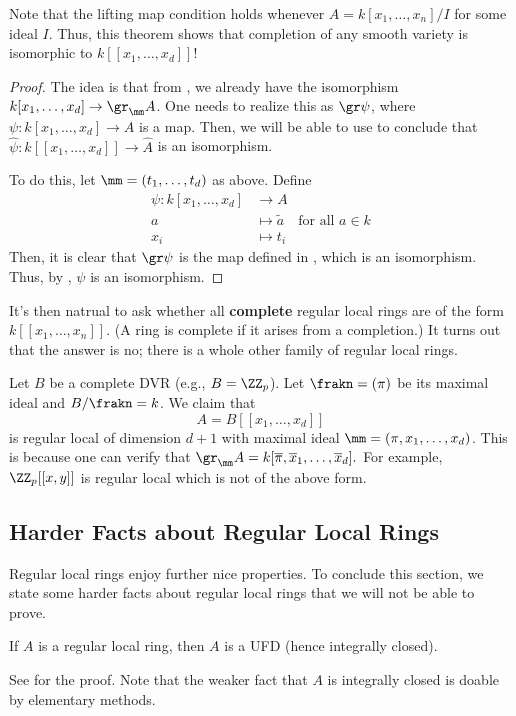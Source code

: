 Note that the lifting map condition holds whenever
$A = k[x_1,\dots,x_n]/I$ for some ideal $I$.
Thus, this theorem shows that completion of any smooth
variety is isomorphic to $k[[x_1,\dots,x_d]]$!
\begin{proof}
The idea is that from ,
we already have the isomorphism
$k[x_1,\dots,x_d]\to \gr_\mm A$. 
One needs to realize this as $\gr\psi$,
where $\psi : k[x_1,\dots,x_d] \to A$ is a map.
Then, we will be able to use 
to conclude that $\widehat\psi : k[[x_1,\dots,x_d]] \to \widehat A$
is an isomorphism.

To do this, let $\mm = (t_1,\dots,t_d)$ as above. Define 
\begin{align*}
    \psi : k[x_1,\dots,x_d] &\to A \\
    a &\mapsto \widetilde a \quad\text{for all } a\in k \\
    x_i &\mapsto t_i
\end{align*}
Then, it is clear that $\gr\psi$ is the map defined
in , which is an isomorphism.
Thus, by ,
$\psi$ is an isomorphism.
\end{proof}
It's then natrual to ask whether all \textbf{complete} 
regular local rings are of the form $k[[x_1,\dots,x_n]]$.
(A ring is complete if it arises from a completion.)
It turns out that the answer is no;
there is a whole other family of regular local rings.
\begin{example}
    Let $B$ be a complete DVR (e.g., $B=\ZZ_p$).
    Let $\frakn=(\pi)$ be its maximal ideal and $B/\frakn=k$.
    We claim that
    $$A = B[[x_1,\dots,x_d]]$$
    is regular local of dimension $d+1$ with
    maximal ideal $\mm = (\pi,x_1,\dots,x_d)$. 
    This is because one can verify that
    $\gr_\mm A = k[\overline \pi, \overline x_1,
    \dots,\overline x_d].$
    For example, $\ZZ_p[[x,y]]$ is regular local
    which is not of the above form.
\end{example}

\subsection{Harder Facts about Regular Local Rings}
\label{subsec:regular_local_hard_facts}
Regular local rings enjoy further nice properties.
To conclude this section, we state some harder
facts about regular local rings that we will 
not be able to prove.

\begin{theorem}
    If $A$ is a regular local ring, then $A$ is a UFD
    (hence integrally closed).
\end{theorem}
See \cite[Thm. 19.19]{eisenbud} for the proof.
Note that the weaker fact that $A$ is integrally
closed is doable by elementary methods.

